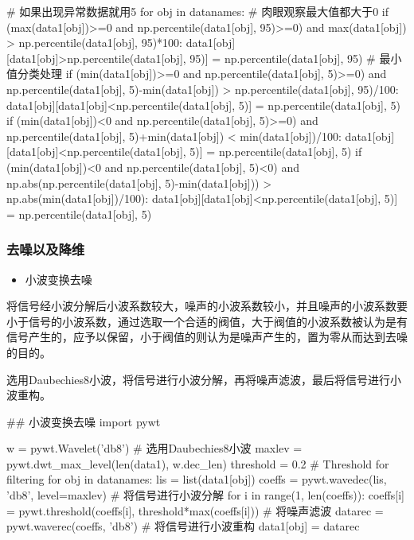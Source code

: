 \documentclass[UTF8,a4paper,AutoFakeBold,AutoFakeSlant]{article}
\begin{document}
\begin{python}
  # 如果出现异常数据就用5%
  for obj in datanames:
      # 肉眼观察最大值都大于0
      if (max(data1[obj])>=0 and np.percentile(data1[obj], 95)>=0) and max(data1[obj]) > np.percentile(data1[obj], 95)*100:
          data1[obj][data1[obj]>np.percentile(data1[obj], 95)] = np.percentile(data1[obj], 95)
      # 最小值分类处理
      if (min(data1[obj])>=0 and np.percentile(data1[obj], 5)>=0) and np.percentile(data1[obj], 5)-min(data1[obj]) > np.percentile(data1[obj], 95)/100:
          data1[obj][data1[obj]<np.percentile(data1[obj], 5)] = np.percentile(data1[obj], 5)
      if (min(data1[obj])<0 and np.percentile(data1[obj], 5)>=0) and np.percentile(data1[obj], 5)+min(data1[obj]) < min(data1[obj])/100:
          data1[obj][data1[obj]<np.percentile(data1[obj], 5)] = np.percentile(data1[obj], 5)
      if (min(data1[obj])<0 and np.percentile(data1[obj], 5)<0) and np.abs(np.percentile(data1[obj], 5)-min(data1[obj])) > np.abs(min(data1[obj])/100):
          data1[obj][data1[obj]<np.percentile(data1[obj], 5)] = np.percentile(data1[obj], 5)
\end{python}


\subsubsection{去噪以及降维}

\begin{itemize}
  \item 小波变换去噪
\end{itemize}

将信号经小波分解后小波系数较大，噪声的小波系数较小，并且噪声的小波系数要小于信号的小波系数，通过选取一个合适的阀值，大于阀值的小波系数被认为是有信号产生的，应予以保留，小于阀值的则认为是噪声产生的，置为零从而达到去噪的目的。

选用Daubechies8小波，将信号进行小波分解，再将噪声滤波，最后将信号进行小波重构。

\begin{python}
  ## 小波变换去噪
  import pywt
  
  w = pywt.Wavelet('db8')  # 选用Daubechies8小波
  maxlev = pywt.dwt_max_level(len(data1), w.dec_len)
  threshold = 0.2  # Threshold for filtering
  for obj in datanames:
      lis = list(data1[obj])
      coeffs = pywt.wavedec(lis, 'db8', level=maxlev)  # 将信号进行小波分解
      for i in range(1, len(coeffs)):
          coeffs[i] = pywt.threshold(coeffs[i], threshold*max(coeffs[i]))  # 将噪声滤波
      datarec = pywt.waverec(coeffs, 'db8')  # 将信号进行小波重构
      data1[obj] = datarec
\end{python}
\end{document}
